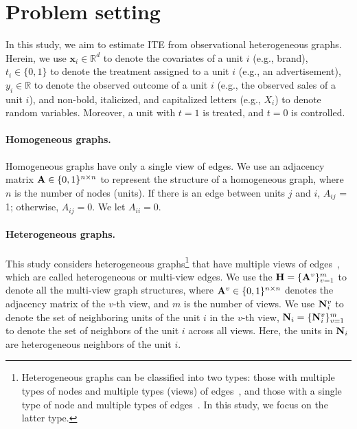 \documentclass[runningheads]{llncs}
\begin{document}
\section{Problem setting}
In this study, we aim to estimate ITE from observational heterogeneous graphs. Herein, we use $\boldsymbol{x}_i \in \mathbb{R}^d$ to denote the covariates of a unit $i$ (e.g., brand), $t_i \in \{0,1\}$ to denote the treatment assigned to a  unit $i$ (e.g., an advertisement), $y_{i} \in \mathbb{R}$ to denote the observed outcome of a unit $i$ (e.g., the observed sales of a unit $i$), and non-bold, italicized, and capitalized letters (e.g., $X_i$) to denote random variables. Moreover, a unit with $t=1$ is treated, and $t=0$ is controlled.
\paragraph{Homogeneous graphs.} Homogeneous graphs have only a single view of edges.   We use an  adjacency matrix $\bold{A} \in \{0,1\}^{n \times n}$ to represent the structure of a homogeneous graph, where $n$ is the number of nodes (units). If there is an edge between units $j$ and $i$, $A_{ij}$ = 1; otherwise, $A_{ij} = 0$. We let $A_{ii} = 0$.

\paragraph{Heterogeneous graphs.} This study considers heterogeneous graphs\footnote{Heterogeneous graphs can be classified into two types: those with multiple types of nodes and multiple types (views) of edges~\cite{Tang-etal09-ICDM}, and those with a single type of node and multiple types of edges~\cite{Tang-etal09-ICDM}. In this study, we focus on the latter type.} that have multiple views of edges~\cite{Tang-etal09-ICDM}, which are called heterogeneous or multi-view edges. We use the $\bold{H} = \{\bold{A}^{v}\}_{v=1}^{m}$ to denote all the multi-view graph structures, where $\bold{A}^{v}\in \{0,1\}^{n \times n}$ denotes the adjacency matrix of the $v$-th view, and $m$ is the number of views. We use $\bold{N}_{i}^v$ to denote the set of neighboring units of the unit $i$ in the $v$-th view,  $\bold{N}_{i}=\{\bold{N}_{i}^v\}^m_{v=1}$ to denote the set of neighbors of the unit $i$ across all views. Here, the units in $\bold{N}_{i}$ are heterogeneous neighbors of the unit $i$. 
\end{document}
